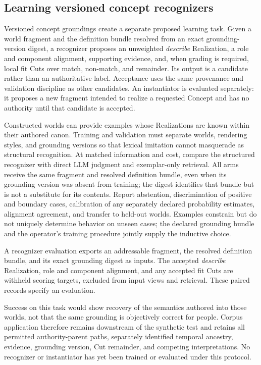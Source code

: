 \documentclass[10pt]{article}
\begin{document}
\subsection{Learning versioned concept recognizers}
\label{sec:concept-recognizers}

Versioned concept groundings create a separate proposed learning task. Given a world
fragment and the definition bundle resolved from an exact grounding-version
digest, a recognizer proposes an
unweighted \emph{describe} Realization, a role and component alignment,
supporting evidence, and, when grading is required, local fit Cuts over match,
non-match, and remainder. Its output is a candidate rather than an
authoritative label. Acceptance uses
the same provenance and validation discipline as other candidates. An
instantiator is evaluated separately: it proposes a new fragment intended to
realize a requested Concept and has no authority until that candidate is
accepted.

Constructed worlds can provide examples whose Realizations are known within
their authored canon. Training and validation must separate worlds, rendering
styles, and grounding versions so that lexical imitation cannot masquerade as
structural recognition. At matched information and cost, compare the structured
recognizer with direct LLM judgment and exemplar-only retrieval. All arms
receive the same fragment and resolved definition bundle, even when its
grounding version was absent from training; the digest identifies that bundle
but is not a substitute for its contents. Report
abstention, discrimination of positive and boundary cases, calibration of any
separately declared probability estimates, alignment agreement, and transfer to held-out worlds. Examples constrain but do
not uniquely determine behavior on unseen cases; the declared grounding bundle
and the operator's training procedure jointly supply the inductive choice.

A recognizer evaluation exports an addressable fragment, the resolved
definition bundle, and its exact grounding digest as inputs. The accepted
\emph{describe} Realization, role and component alignment, and any accepted fit
Cuts are withheld scoring targets, excluded from input views and retrieval.
These paired records specify an evaluation.

Success on this task would show recovery of the semantics authored into those
worlds, not that the same grounding is objectively correct for people. Corpus
application therefore remains downstream of the synthetic test and retains all
permitted authority-parent paths, separately identified temporal ancestry,
evidence, grounding version, Cut
remainder, and competing
interpretations. No recognizer or instantiator has yet been trained or
evaluated under this protocol.
\end{document}
